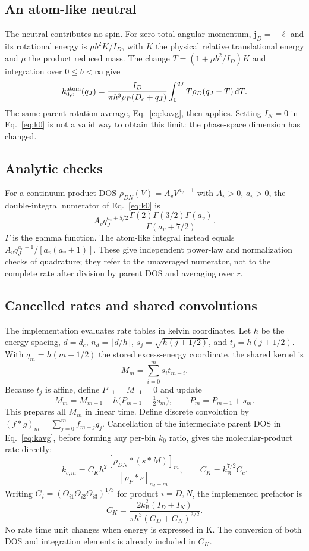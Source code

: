 \documentclass[10pt,a4paper]{article}
\newcommand{\dd}{\,\mathrm d}
\newcommand{\kb}{k_{\mathrm B}}
\begin{document}
\subsection{An atom-like neutral}
The neutral contributes no spin. For zero total angular momentum,
$\mathbf j_D=-\boldsymbol\ell$ and its rotational energy is
$\mu b^2K/I_D$, with $K$ the physical relative translational energy and
$\mu$ the product reduced mass. The change
$T=(1+\mu b^2/I_D)K$ and integration over $0\leq b<\infty$ give~\cite{atom}
\begin{equation}
 k_{0,c}^{\rm atom}(q_J)=
 \frac{I_D}{\pi\hbar^3\rho_P(D_c+q_J)}
 \int_0^{q_J}T\rho_D(q_J-T)\dd T.
 \label{eq:atomrate}
\end{equation}
The same parent rotation average, Eq.~\eqref{eq:kavg}, then applies. Setting
$I_N=0$ in Eq.~\eqref{eq:k0} is not a valid way to obtain this limit: the
phase-space dimension has changed.

\subsection{Analytic checks}
For a continuum product DOS $\rho_{DN}(V)=A_v V^{a_v-1}$ with
$A_v>0$, $a_v>0$, the double-integral numerator of Eq.~\eqref{eq:k0} is
\[
 A_v q_J^{a_v+5/2}
 \frac{\Gamma(2)\Gamma(3/2)\Gamma(a_v)}{\Gamma(a_v+7/2)}.
\]
$\Gamma$ is the gamma function. The atom-like integral instead equals
$A_v q_J^{a_v+1}/[a_v(a_v+1)]$.
These give independent power-law and normalization checks of quadrature;
they refer to the unaveraged numerator, not to the complete rate after
division by parent DOS and averaging over $r$.

\clearpage
\subsection{Cancelled rates and shared convolutions}
The implementation evaluates rate tables in kelvin coordinates. Let $h$ be
the energy spacing, $d=d_c$, $n_d=\lfloor d/h\rfloor$,
$s_j=\sqrt{h(j+1/2)}$, and $t_j=h(j+1/2)$. With
$q_m=h(m+1/2)$ the stored excess-energy coordinate, the shared kernel is
\[
 M_m=\sum_{i=0}^m s_i t_{m-i}.
\]
Because $t_j$ is affine, define $P_{-1}=M_{-1}=0$ and update
\begin{equation}
 M_m=M_{m-1}+h\bigl(P_{m-1}+\tfrac12s_m\bigr),\qquad
 P_m=P_{m-1}+s_m.
\label{eq:linearmesh}
\end{equation}
This prepares all $M_m$ in linear time. Define discrete convolution by
$(f*g)_m=\sum_{j=0}^m f_{m-j}g_j$. Cancellation of the intermediate parent
DOS in Eq.~\eqref{eq:kavg}, before forming any per-bin $k_0$ ratio, gives
the molecular-product rate directly:
\begin{equation}
 k_{c,m}=C_Kh^2\frac{[\rho_{DN}*(s*M)]_m}
 {[\rho_P*s]_{n_d+m}},\qquad C_K=\kb^{7/2}C_c.
 \label{eq:discreteavg}
\end{equation}
Writing $G_i=(\Theta_{i1}\Theta_{i2}\Theta_{i3})^{1/3}$ for product $i=D,N$,
the implemented prefactor is
\[
 C_K=\frac{2\kb^2(I_D+I_N)}{\pi\hbar^3(G_D+G_N)^{3/2}}.
\]
No rate time unit changes when energy is expressed in K. The conversion
of both DOS and integration elements is already included in $C_K$.
\end{document}
